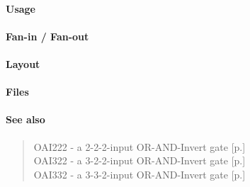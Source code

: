 \paragraph{Usage}

\paragraph{Fan-in / Fan-out}

\paragraph{Layout}

\paragraph{Files}

\paragraph{See also}
\begin{quote}
    OAI222 - a 2-2-2-input OR-AND-Invert gate [p.\pageref{OAI222}] \\
    OAI322 - a 3-2-2-input OR-AND-Invert gate [p.\pageref{OAI322}] \\
    OAI332 - a 3-3-2-input OR-AND-Invert gate [p.\pageref{OAI332}]
\end{quote}
